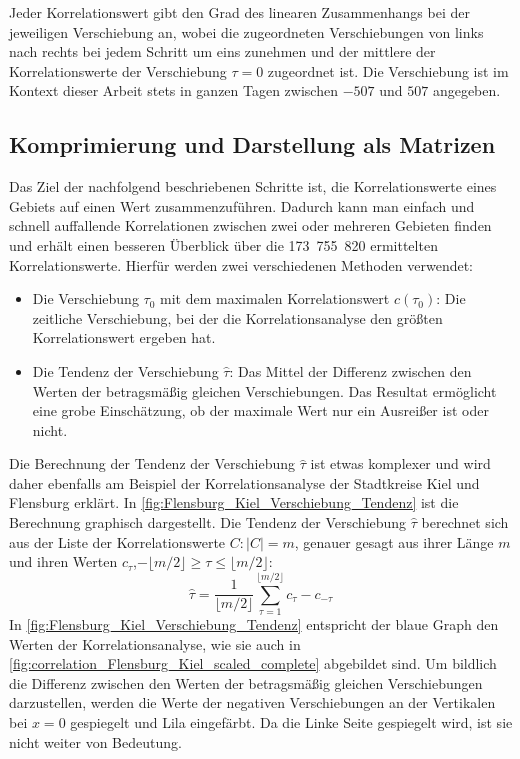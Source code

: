 Jeder Korrelationswert gibt den Grad des linearen Zusammenhangs bei der jeweiligen Verschiebung an, wobei die zugeordneten Verschiebungen von links nach rechts bei jedem Schritt um eins zunehmen und der mittlere der Korrelationswerte der Verschiebung $\tau = 0$ zugeordnet ist. Die Verschiebung ist im Kontext dieser Arbeit stets in ganzen Tagen zwischen $-507$ und $507$ angegeben. 

\subsection{Komprimierung und Darstellung als Matrizen}\label{sec:Grundlagen:Korrelation:Komprimierung}
Das Ziel der nachfolgend beschriebenen Schritte ist, die Korrelationswerte eines Gebiets auf einen Wert zusammenzuführen. Dadurch kann man einfach und schnell auffallende Korrelationen zwischen zwei oder mehreren Gebieten finden und erhält einen besseren Überblick über die 173~755~820 ermittelten Korrelationswerte.
Hierfür werden zwei verschiedenen Methoden verwendet:
\begin{itemize}
    \item Die Verschiebung $\tau_0$ mit dem maximalen Korrelationswert $c(\tau_0)$: Die zeitliche Verschiebung, bei der die Korrelationsanalyse den größten Korrelationswert ergeben hat.
    \item Die Tendenz der Verschiebung $\hat{\tau}$: 
    Das Mittel der Differenz zwischen den Werten der betragsmäßig gleichen Verschiebungen.
    Das Resultat ermöglicht eine grobe Einschätzung, ob der maximale Wert nur ein Ausreißer ist oder nicht.
\end{itemize}

Die Berechnung der Tendenz der Verschiebung $\hat{\tau}$ ist etwas komplexer und wird daher ebenfalls am Beispiel der Korrelationsanalyse der Stadtkreise Kiel und Flensburg erklärt.
In \autoref{fig:Flensburg_Kiel_Verschiebung_Tendenz} ist die Berechnung graphisch dargestellt.
Die Tendenz der Verschiebung $\hat{\tau}$ berechnet sich aus der Liste der Korrelationswerte $C:\vert C\vert =m$, genauer gesagt aus ihrer Länge $m$ und ihren Werten $c_\tau$,$ -\lfloor m/2 \rfloor\geq \tau\leq \lfloor m/2 \rfloor$:
\begin{equation}\label{eq:Tendenz der Verschiebung}
    \hat{\tau} = \frac{1}{\lfloor m/2 \rfloor}
    \sum_{\tau=1}^{\lfloor m/2 \rfloor}c_{\tau}-c_{-\tau}
\end{equation}
In \autoref{fig:Flensburg_Kiel_Verschiebung_Tendenz} entspricht der blaue Graph den Werten der Korrelationsanalyse, wie sie auch in \autoref{fig:correlation_Flensburg_Kiel_scaled_complete} abgebildet sind. Um bildlich die Differenz zwischen den Werten der betragsmäßig gleichen Verschiebungen darzustellen, werden die Werte der negativen Verschiebungen an der Vertikalen bei $x=0$ gespiegelt und Lila eingefärbt.
Da die Linke Seite gespiegelt wird, ist sie nicht weiter von Bedeutung.

